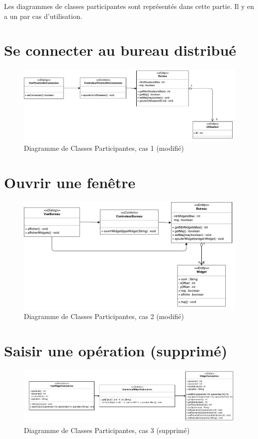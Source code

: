 Les diagrammes de classes participantes sont représentés dans cette partie. Il y en a un par cas d'utilisation.

\section{Se connecter au bureau distribué}

\noindent\begin{figure}[H]
	\centering
	\includegraphics[angle=90]{diagrammes/DCP1.pdf}
	\caption{\color{green}Diagramme de Classes Participantes, cas 1 (modifié)\color{black}}
\end{figure}

\section{Ouvrir une fenêtre}

\begin{figure}[H]
	\centering
	\includegraphics[angle=90]{diagrammes/DCP2.pdf}
	\caption{\color{green}Diagramme de Classes Participantes, cas 2 (modifié)\color{black}}
\end{figure}

\section{\color{red}Saisir une opération (supprimé)}
\noindent\begin{figure}[H]
	\centering
	\includegraphics[angle=90,scale=0.9]{diagrammes/DCP4.jpg}
	\caption{\color{red}Diagramme de Classes Participantes, cas 3 (supprimé)\color{black}}
\end{figure}

